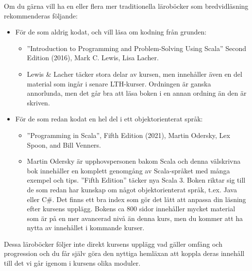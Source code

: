 Om du gärna vill ha en eller flera mer traditionella läroböcker som bredvidläsning rekommenderas följande:
\begin{itemize}[noitemsep, leftmargin=*]
\item För de som aldrig kodat, och vill läsa om kodning från grunden:
\begin{itemize}[nolistsep]
\item ''Introduction to Programming and Problem-Solving Using Scala'' Second Edition (2016), Mark C. Lewis, Lisa Lacher.  %

\item Lewis \& Lacher täcker stora delar av kursen, men innehåller även en del material som ingår i senare LTH-kurser. Ordningen är ganska annorlunda, men det går bra att läsa boken i en annan ordning än den är skriven.
\end{itemize}
\item För de som redan kodat en hel del i ett objektorienterat språk:
\begin{itemize}[nolistsep, noitemsep]
\item ''Programming in Scala'', Fifth Edition (2021), Martin Odersky, Lex Spoon, and Bill Venners.  
  \item Martin Odersky är upphovspersonen bakom Scala och denna välskrivna bok innehåller en komplett genomgång av Scala-språket med många exempel och tips. ''Fifth Edition'' täcker nya Scala 3. Boken riktar sig till de som redan har kunskap om något objektorienterat språk, t.ex. Java eller C\#. Det finns ett bra index som gör det lätt att anpassa din läsning efter kursens upplägg. Bokens ca 800 sidor innehåller mycket material som är på en mer avancerad nivå än denna kurs, men du kommer att ha nytta av innehållet i kommande kurser.
\end{itemize}
\end{itemize}
Dessa läroböcker följer inte direkt kursens upplägg vad gäller omfång och progression och du får själv göra den nyttiga hemläxan att koppla  deras innehåll till det vi går igenom i kursens olika moduler.

